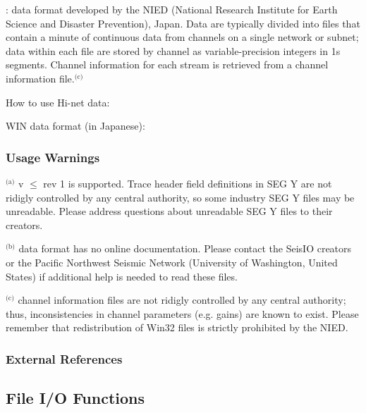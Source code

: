 \documentclass[letterpaper,11pt,english]{sphinxmanual}
\begin{document}
 : data format developed by the NIED (National Research Institute for Earth Science and Disaster Prevention), Japan. Data are typically divided into files that contain a minute of continuous data from channels on a single network or subnet; data within each file are stored by channel as variable-precision integers in 1s segments. Channel information for each stream is retrieved from a channel information file.$^{\text{(c)}}$ %
\begin{footnote}[7]\sphinxAtStartFootnote
How to use Hi-net data: 
%
\end{footnote} %
\begin{footnote}[8]\sphinxAtStartFootnote
WIN data format (in Japanese): 
%
\end{footnote}


\subsubsection{Usage Warnings}
\label{\detokenize{src/Formats/fileformats:usage-warnings}}
$^{\text{(a)}}$   v \(\le\) rev 1 is supported. Trace header field
definitions in SEG Y are not ridigly controlled by any central authority, so
some industry SEG Y files may be unreadable. Please address questions about
unreadable SEG Y files to their creators.

$^{\text{(b)}}$   data format has no online documentation. Please contact the SeisIO creators or the Pacific Northwest Seismic Network (University of Washington, United States) if additional help is needed to read these files.

$^{\text{(c)}}$   channel information files are not ridigly controlled by any central authority; thus, inconsistencies in channel parameters (e.g. gains) are known to exist. Please remember that redistribution of Win32 files is strictly prohibited by the NIED.
\subsubsection*{External References}


\subsection{File I/O Functions}
\label{\detokenize{src/Formats/fileformats:file-i-o-functions}}
\end{document}
